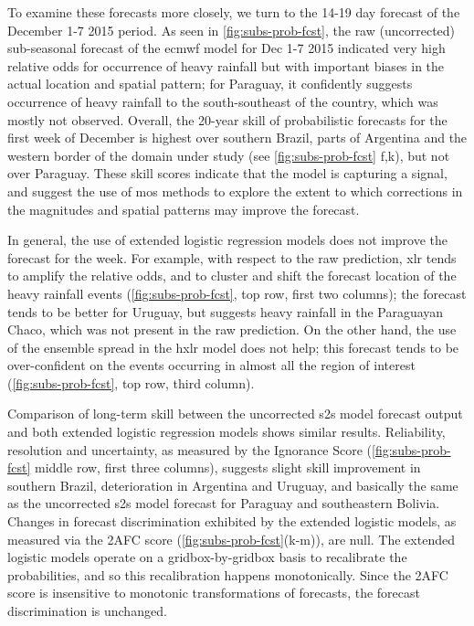 \documentclass[twocol]{ametsoc}
\begin{document}
To examine these forecasts more closely, we turn to the 14-19 day forecast of the December 1-7 2015 period.
As seen in \cref{fig:subs-prob-fcst}, the raw (uncorrected) sub-seasonal forecast of the \gls{ecmwf} model for Dec 1-7 2015 indicated very high relative odds for occurrence of heavy rainfall but with important biases in the actual location and spatial pattern; for Paraguay, it confidently suggests occurrence of heavy rainfall to the south-southeast of the country, which was mostly not observed.
Overall, the 20-year skill of probabilistic forecasts for the first week of December is highest over southern Brazil, parts of Argentina and the western border of the domain under study (see \cref{fig:subs-prob-fcst} f,k), but not over Paraguay.
These skill scores indicate that the model is capturing a signal, and suggest the use of \gls{mos} methods to explore the extent to which corrections in the magnitudes and spatial patterns may improve the forecast.

In general, the use of extended logistic regression models does not improve the forecast for the week.
For example, with respect to the raw prediction, \gls{xlr} tends to amplify the relative odds, and to cluster and shift the forecast location of the heavy rainfall events (\cref{fig:subs-prob-fcst}, top row, first two columns); the forecast tends to be better for Uruguay, but suggests heavy rainfall in the Paraguayan Chaco, which was not present in the raw prediction.
On the other hand, the use of the ensemble spread in the \gls{hxlr} model does not help; this forecast tends to be over-confident on the events occurring in almost all the region of interest (\cref{fig:subs-prob-fcst}, top row, third column).

Comparison of long-term skill between the uncorrected \gls{s2s} model forecast output and both extended logistic regression models shows similar results.
Reliability, resolution and uncertainty, as measured by the Ignorance Score (\cref{fig:subs-prob-fcst} middle row, first three columns), suggests slight skill improvement in southern Brazil, deterioration in Argentina and Uruguay, and basically the same as the uncorrected \gls{s2s} model forecast for Paraguay and southeastern Bolivia.
Changes in forecast discrimination exhibited by the extended logistic models, as measured via the 2AFC score (\cref{fig:subs-prob-fcst}(k-m)), are  null.
The extended logistic models operate on a gridbox-by-gridbox basis to recalibrate the probabilities, and so this recalibration happens monotonically.
Since the 2AFC score is insensitive to monotonic transformations of forecasts, the forecast discrimination is unchanged.
\end{document}
